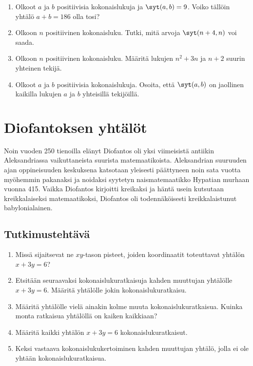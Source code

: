 \begin{enumerate}
\item Olkoot $a$ ja $b$ positiivisia kokonaislukuja ja $\syt(a, b)=9$. Voiko tällöin yhtälö $a + b = 186$ olla tosi?

\item Olkoon $n$ positiivinen kokonaisluku. Tutki, mitä arvoja $\syt(n+4, n)$ voi saada.

\item Olkoon $n$ positiivinen kokonaisluku. Määritä lukujen $n^2 + 3n$ ja $n + 2$ suurin yhteinen tekijä.

\item Olkoot $a$ ja $b$ positiivisia kokonaislukuja. Osoita, että $\syt(a, b)$ on jaollinen kaikilla lukujen $a$ ja $b$ yhteisillä tekijöillä.

\end{enumerate}


\newpage

\section{Diofantoksen yhtälöt}
Noin vuoden 250 tienoilla elänyt Diofantos oli yksi viimeisistä antiikin Aleksandriassa vaikuttaneista suurista matemaatikoista. Aleksandrian suuruuden ajan oppineisuuden keskuksena katsotaan yleisesti päättyneen noin sata vuotta myöhemmin pakanaksi ja noidaksi syytetyn naismatemaatikko Hypatian murhaan vuonna 415. Vaikka Diofantos kirjoitti kreikaksi ja häntä usein kutsutaan kreikkalaiseksi matemaatikoksi, Diofantos oli todennäköisesti kreikkalaistunut babylonialainen. 

\subsection*{Tutkimustehtävä}
\begin{enumerate}
\item Missä sijaitsevat ne $xy$-tason pisteet, joiden koordinaatit toteuttavat yhtälön $x + 3y = 6$?
\item Etsitään seuraavaksi kokonaislukuratkaisuja kahden muuttujan yhtälölle $x + 3y = 6$. Määritä yhtälölle jokin kokonaislukuratkaisu.
\item Määritä yhtälölle vielä ainakin kolme muuta kokonaislukuratkaisua. Kuinka monta ratkaisua yhtälöllä on kaiken kaikkiaan?
\item Määritä kaikki yhtälön $x + 3y = 6$ kokonaislukuratkaisut.
\item Keksi vastaava kokonaislukukertoiminen kahden muuttujan yhtälö, jolla ei ole yhtään kokonaislukuratkaisua.
\end{enumerate}

